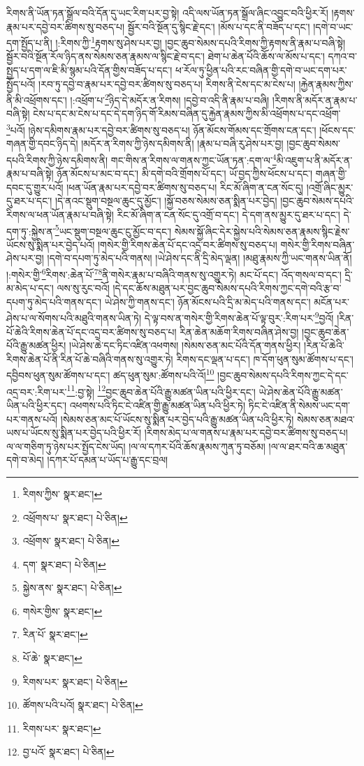 རིགས་ནི་ཡོན་ཏན་སྒྲོལ་བའི་དོན་དུ་ཡང་རིག་པར་བྱ་སྟེ། འདི་ལས་ཡོན་ཏན་སྒྲོལ་ཞིང་འབྱུང་བའི་ཕྱིར་རོ། །རྟགས་རྣམ་པར་དབྱེ་བར་ཚིགས་སུ་བཅད་པ། སྦྱོར་བའི་སྔོན་དུ་སྙིང་རྗེ་དང་། །མོས་པ་དང་ནི་བཟོད་པ་དང་། །དགེ་བ་ཡང་དག་སྤྱོད་པ་ནི། །:རིགས་ཀྱི་\footnote{རིགས་ཀྱིས་  སྣར་ཐང་། }རྟགས་སུ་ཤེས་པར་བྱ། །བྱང་ཆུབ་སེམས་དཔའི་རིགས་ཀྱི་རྟགས་ནི་རྣམ་པ་བཞི་སྟེ། སྦྱོར་བའི་སྔོན་རོལ་ཉིད་ནས་སེམས་ཅན་རྣམས་ལ་སྙིང་རྗེ་བ་དང་། ཐེག་པ་ཆེན་པོའི་ཆོས་ལ་མོས་པ་དང་། དཀའ་བ་སྤྱད་པ་དག་ལ་ཇི་མི་སྙམ་པའི་དོན་གྱིས་བཟོད་པ་དང་། ཕ་རོལ་ཏུ་ཕྱིན་པའི་རང་བཞིན་གྱི་དགེ་བ་ཡང་དག་པར་སྤྱོད་པའོ། །རབ་ཏུ་དབྱེ་བ་རྣམ་པར་དབྱེ་བར་ཚིགས་སུ་བཅད་པ། རིགས་ནི་ངེས་དང་མ་ངེས་པ། །རྐྱེན་རྣམས་ཀྱིས་ནི་མི་འཕྲོགས་དང་། །:འཕྲོག་པ་\footnote{འཕྲོགས་པ་  སྣར་ཐང་།  པེ་ཅིན། }ཉིད་དེ་མདོར་ན་རིགས། །དབྱེ་བ་འདི་ནི་རྣམ་པ་བཞི། །རིགས་ནི་མདོར་ན་རྣམ་པ་བཞི་སྟེ། ངེས་པ་དང་མ་ངེས་པ་དང་དེ་དག་ཉིད་གོ་རིམས་བཞིན་དུ་རྐྱེན་རྣམས་ཀྱིས་མི་འཕྲོགས་པ་དང་འཕྲོག་\footnote{འཕྲོགས་  སྣར་ཐང་།  པེ་ཅིན། }པའོ། །ཉེས་དམིགས་རྣམ་པར་དབྱེ་བར་ཚིགས་སུ་བཅད་པ། ཉོན་མོངས་གོམས་དང་གྲོགས་ངན་དང་། །ཕོངས་དང་གཞན་གྱི་དབང་ཉིད་དེ། །མདོར་ན་རིགས་ཀྱི་ཉེས་དམིགས་ནི། །རྣམ་པ་བཞི་རུ་ཤེས་པར་བྱ། །བྱང་ཆུབ་སེམས་དཔའི་རིགས་ཀྱི་ཉེས་དམིགས་ནི། གང་གིས་ན་རིགས་ལ་གནས་ཀྱང་ཡོན་ཏན་:དག་ལ་\footnote{དག་  སྣར་ཐང་།  པེ་ཅིན། }མི་འཇུག་པ་ནི་མདོར་ན་རྣམ་པ་བཞི་སྟེ། ཉོན་མོངས་པ་མང་བ་དང་། མི་དགེ་བའི་གྲོགས་པོ་དང་། ཡོ་བྱད་ཀྱིས་ཕོངས་པ་དང་། གཞན་གྱི་དབང་དུ་གྱུར་པའོ། །ཕན་ཡོན་རྣམ་པར་དབྱེ་བར་ཚིགས་སུ་བཅད་པ། རིང་མོ་ཞིག་ན་ངན་སོང་དུ། །འགྲོ་ཞིང་མྱུར་དུ་ཐར་པ་དང་། །དེ་ནའང་སྡུག་བསྔལ་ཆུང་དུ་མྱོང་། །སྐྱོ་བཅས་སེམས་ཅན་སྨིན་པར་བྱེད། །བྱང་ཆུབ་སེམས་དཔའི་རིགས་ལ་ཕན་ཡོན་རྣམ་པ་བཞི་སྟེ། རིང་མོ་ཞིག་ན་ངན་སོང་དུ་འགྲོ་བ་དང་། དེ་དག་ནས་མྱུར་དུ་ཐར་པ་དང་། དེ་དག་ཏུ་:སྐྱེས་ན་\footnote{སྐྱེས་ནས་  སྣར་ཐང་།  པེ་ཅིན། }ཡང་སྡུག་བསྔལ་ཆུང་ངུ་མྱོང་བ་དང་། སེམས་སྐྱོ་ཞིང་དེར་སྐྱེས་པའི་སེམས་ཅན་རྣམས་སྙིང་རྗེས་ཡོངས་སུ་སྨིན་པར་བྱེད་པའོ། །གསེར་གྱི་རིགས་ཆེན་པོ་དང་འདྲ་བར་ཚིགས་སུ་བཅད་པ། གསེར་གྱི་རིགས་བཞིན་ཤེས་པར་བྱ། །དགེ་བ་དཔག་ཏུ་མེད་པའི་གནས། །ཡེ་ཤེས་དང་ནི་དྲི་མེད་ལྡན། །མཐུ་རྣམས་ཀྱི་ཡང་གནས་ཡིན་ནོ། །:གསེར་གྱི་\footnote{གསེར་གྱིས་  སྣར་ཐང་། }རིགས་:ཆེན་པོ་\footnote{རིན་པོ་  སྣར་ཐང་། }\footnote{པོ་ཆེ་  སྣར་ཐང་། }ནི་གསེར་རྣམ་པ་བཞིའི་གནས་སུ་འགྱུར་ཏེ། མང་པོ་དང་། འོད་གསལ་བ་དང་། དྲི་མ་མེད་པ་དང་། ལས་སུ་རུང་བའོ། །དེ་དང་ཆོས་མཐུན་པར་བྱང་ཆུབ་སེམས་དཔའི་རིགས་ཀྱང་དགེ་བའི་རྩ་བ་དཔག་ཏུ་མེད་པའི་གནས་དང་། ཡེ་ཤེས་ཀྱི་གནས་དང་། ཉོན་མོངས་པའི་དྲི་མ་མེད་པའི་གནས་དང་། མངོན་པར་ཤེས་པ་ལ་སོགས་པའི་མཐུའི་གནས་ཡིན་ཏེ། དེ་ལྟ་བས་ན་གསེར་གྱི་རིགས་ཆེན་པོ་ལྟ་བུར་:རིག་པར་\footnote{རིགས་པར་  སྣར་ཐང་།  པེ་ཅིན། }བྱའོ། །རིན་པོ་ཆེའི་རིགས་ཆེན་པོ་དང་འདྲ་བར་ཚིགས་སུ་བཅད་པ། རིན་ཆེན་མཆོག་རིགས་བཞིན་ཤེས་བྱ། །བྱང་ཆུབ་ཆེན་པོའི་རྒྱུ་མཚན་ཕྱིར། །ཡེ་ཤེས་ཆེ་དང་ཏིང་འཛིན་འཕགས། །སེམས་ཅན་མང་པོའི་དོན་གནས་ཕྱིར། །རིན་པོ་ཆེའི་རིགས་ཆེན་པོ་ནི་རིན་པོ་ཆེ་བཞིའི་གནས་སུ་འགྱུར་ཏེ། རིགས་དང་ལྡན་པ་དང་། ཁ་དོག་ཕུན་སུམ་ཚོགས་པ་དང་། དབྱིབས་ཕུན་སུམ་ཚོགས་པ་དང་། ཚད་ཕུན་སུམ་:ཚོགས་པའི་འོ།\footnote{ཚོགས་པའི་པའོ།  སྣར་ཐང་།  པེ་ཅིན། } །བྱང་ཆུབ་སེམས་དཔའི་རིགས་ཀྱང་དེ་དང་འདྲ་བར་:རིག་པར་\footnote{རིགས་པར་  སྣར་ཐང་། }:བྱ་སྟེ། \footnote{བྱ་པའོ་  སྣར་ཐང་།  པེ་ཅིན། }བྱང་ཆུབ་ཆེན་པོའི་རྒྱུ་མཚན་ཡིན་པའི་ཕྱིར་དང་། ཡེ་ཤེས་ཆེན་པོའི་རྒྱུ་མཚན་ཡིན་པའི་ཕྱིར་དང་། འཕགས་པའི་ཏིང་ངེ་འཛིན་གྱི་རྒྱུ་མཚན་ཡིན་པའི་ཕྱིར་ཏེ། ཏིང་ངེ་འཛིན་ནི་སེམས་ཡང་དག་པར་གནས་པའོ། །སེམས་ཅན་མང་པོ་ཡོངས་སུ་སྨིན་པར་བྱེད་པའི་རྒྱུ་མཚན་ཡིན་པའི་ཕྱིར་ཏེ། སེམས་ཅན་མཐའ་ཡས་པ་ཡོངས་སུ་སྨིན་པར་བྱེད་པའི་ཕྱིར་རོ། །རིགས་མེད་པ་ལ་གནས་པ་རྣམ་པར་དབྱེ་བར་ཚིགས་སུ་བཅད་པ། ལ་ལ་གཅིག་ཏུ་ཉེས་པར་སྤྱོད་ངེས་ཡོད། །ལ་ལ་དཀར་པོའི་ཆོས་རྣམས་ཀུན་ཏུ་བཅོམ། །ལ་ལ་ཐར་བའི་ཆ་མཐུན་དགེ་བ་མེད། །དཀར་པོ་དམན་པ་ཡོད་པ་རྒྱུ་དང་བྲལ། 